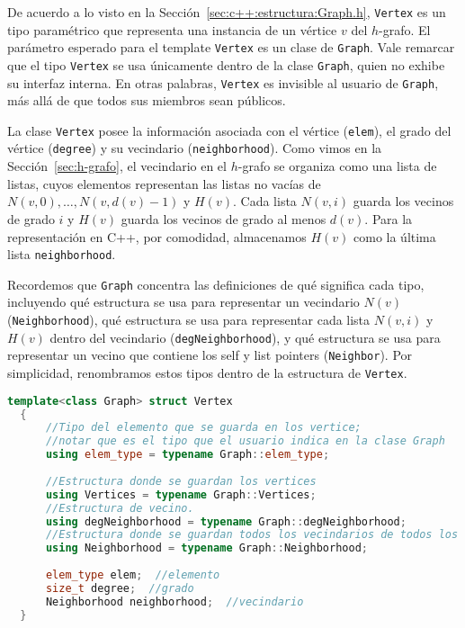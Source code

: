 \documentclass[%
    a4paper,%
    12pt,%
    twoside,%
    openright,%
    halfparskip,%
    cleardoubleempty,%
    bigheadings,%
    titlepage,%
    headsepline%
]{scrbook}
\makeatletter
\newcommand{\Code}[1]{\lstinline[basicstyle={\tt}]@#1@}
\makeatother
\begin{document}
De acuerdo a lo visto en la Sección~\ref{sec:c++:estructura:Graph.h}, \Code{Vertex} es un tipo paramétrico que representa una instancia de un vértice $v$ del $h$-grafo.  El parámetro esperado para el template \Code{Vertex} es un clase de \Code{Graph}.  Vale remarcar que el tipo \Code{Vertex} se usa únicamente dentro de la clase \Code{Graph}, quien no exhibe su interfaz interna.  En otras palabras, \Code{Vertex} es invisible al usuario de \Code{Graph}, más allá de que todos sus miembros sean públicos.

La clase \Code{Vertex} posee la información asociada con el vértice (\Code{elem}), el grado del vértice (\Code{degree}) y su vecindario (\Code{neighborhood}).  Como vimos en la Sección~\ref{sec:h-grafo}, el vecindario en el $h$-grafo se organiza como una lista de listas, cuyos elementos representan las listas no vacías de $N(v, 0), \ldots, N(v, d(v)-1)$ y $H(v)$.  Cada lista $N(v, i)$ guarda los vecinos de grado $i$ y $H(v)$ guarda los vecinos de grado al menos $d(v)$.  Para la representación en C++, por comodidad, almacenamos $H(v)$ como la última lista \Code{neighborhood}.

Recordemos que \Code{Graph} concentra las definiciones de qué significa cada tipo, incluyendo qué estructura se usa para representar un vecindario $N(v)$ (\Code{Neighborhood}), qué estructura se usa para representar cada lista $N(v, i)$ y $H(v)$ dentro del vecindario (\Code{degNeighborhood}), y qué estructura se usa para representar un vecino que contiene los self y list pointers (\Code{Neighbor}).  Por simplicidad, renombramos estos tipos dentro de la estructura de \Code{Vertex}.

\begin{lstlisting}[language={C++},caption={Estructura del tipo Grafo en C++.},gobble=2,float=ht,label={lst:c++:graph}]
  template<class Graph> struct Vertex
  {
      //Tipo del elemento que se guarda en los vertice;
      //notar que es el tipo que el usuario indica en la clase Graph
      using elem_type = typename Graph::elem_type;
  
      //Estructura donde se guardan los vertices
      using Vertices = typename Graph::Vertices;
      //Estructura de vecino.
      using degNeighborhood = typename Graph::degNeighborhood;
      //Estructura donde se guardan todos los vecindarios de todos los grados.
      using Neighborhood = typename Graph::Neighborhood;
      
      elem_type elem;  //elemento
      size_t degree;  //grado
      Neighborhood neighborhood;  //vecindario
  }
\end{lstlisting}
\end{document}
